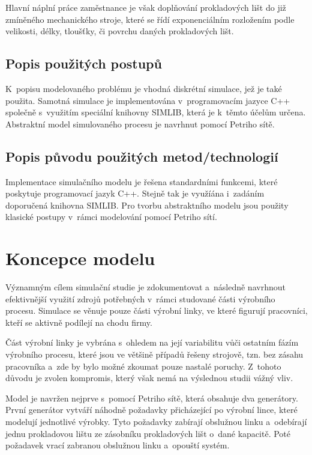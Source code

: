 \documentclass[a4paper, 11pt]{article}
\begin{document}
    Hlavní náplní práce zaměstnance je však doplňování prokladových lišt do již zmíněného mechanického stroje, které se řídí exponenciálním rozložením podle velikosti, délky, tloušťky, či povrchu daných prokladových lišt.

\subsection{Popis použitých postupů}
    K~popisu modelovaného problému je vhodná diskrétní simulace, jež je také použita.
    Samotná simulace je implementována v~programovacím jazyce C++ společně s~využitím speciální knihovny SIMLIB, která je k~těmto účelům určena.
    Abstraktní model simulovaného procesu je navrhnut pomocí Petriho sítě.

\subsection{Popis původu použitých metod/technologií}
    Implementace simulačního modelu je řešena standardními funkcemi, které poskytuje programovací jazyk C++.
    Stejně tak je využíána i~zadáním doporučená knihovna SIMLIB.
    Pro tvorbu abstraktního modelu jsou použity klasické postupy v~rámci modelování pomocí Petriho sítí.

\newpage

\section{Koncepce modelu}
    Významným cílem simulační studie je zdokumentovat a~následně navrhnout efektivnější využití zdrojů potřebných v~rámci studované části výrobního procesu.
    Simulace se věnuje pouze části výrobní linky, ve které figurují pracovníci, kteří se aktivně podílejí na chodu firmy.

    Část výrobní linky je vybrána s~ohledem na její variabilitu vůči ostatním fázím výrobního procesu, které jsou ve většině případů řešeny strojově, tzn. bez zásahu pracovníka a~zde by bylo možné zkoumat pouze nastalé poruchy.
    Z~tohoto důvodu je zvolen kompromis, který však nemá na výslednou studii vážný vliv.

    Model je navržen nejprve s~pomocí Petriho sítě, která obsahuje dva generátory.
    První generátor vytváří náhodně požadavky přicházející po výrobní lince, které modelují jednotlivé výrobky.
    Tyto požadavky zabírají obslužnou linku a~odebírají jednu prokladovou lištu ze zásobníku prokladových lišt o~dané kapacitě.
    Poté požadavek vrací zabranou obslužnou linku a~opouští systém.
\end{document}
